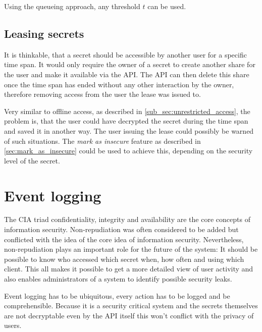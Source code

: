 Using the queueing approach, any threshold $t$ can be used.

\subsection{Leasing secrets}
\label{sec:leasing_secrets}

It is thinkable, that a secret should be accessible by another user for a
specific time span. It would only require the owner of a secret to create
another share for the user and make it available via the API. The API can then
delete this share once the time span has ended without any other interaction by
the owner, therefore removing access from the user the lease was issued to.

Very similar to offline access, as described in
\ref{sub_sec:unrestricted_access}, the problem is, that the user could have
decrypted the secret during the time span and saved it in another way. The user
issuing the lease could possibly be warned of such situations. The
\textit{mark as insecure} feature as described in \ref{sec:mark_as_insecure}
could be used to achieve this, depending on the security level of the secret.

\section{Event logging}
\label{sec:event_logging}

The CIA triad confidentiality, integrity and availability are the core concepts
of information security. Non-repudiation was often considered to be added but
conflicted with the idea of the core idea of information security.
Nevertheless, non-repudiation plays an important role for the future of the
system: It should be possible to know who accessed which secret when, how often
and using which client. This all makes it possible to get a more detailed view
of user activity and also enables administrators of a system to identify
possible security leaks.

Event logging has to be ubiquitous, every action has to be logged and be
comprehensible. Because it is a security critical system and the secrets
themselves are not decryptable even by the API itself this won't conflict with
the privacy of users.


